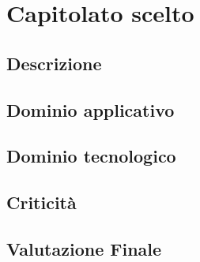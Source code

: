 \section {Capitolato scelto}
	\subsection {Descrizione}
	\subsection {Dominio applicativo}
	\subsection {Dominio tecnologico}
	\subsection {Criticità}
	\subsection {Valutazione Finale}